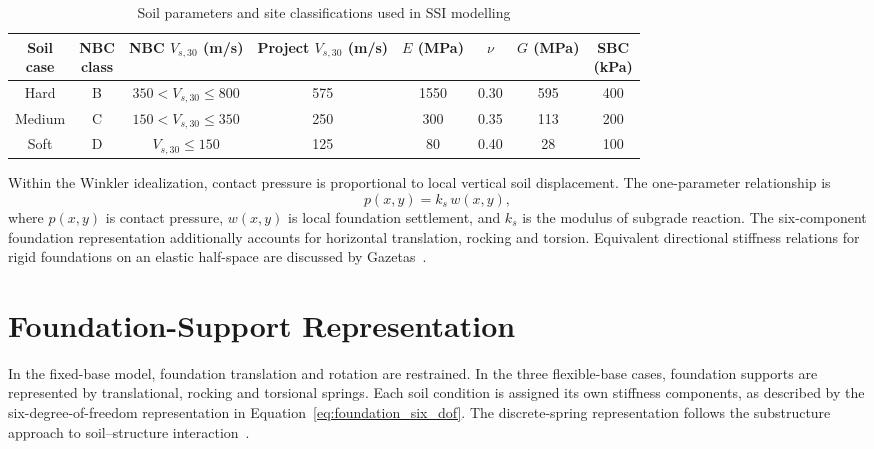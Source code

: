 \begin{table}[htbp]
\fontsize{11}{13}\selectfont\setlength{\tabcolsep}{4pt}
\centering
\caption{Soil parameters and site classifications used in SSI modelling}
\label{tab:soil_property_inputs}
\fontsize{11}{13}\selectfont
\setlength{\tabcolsep}{2pt}
\begin{tabular*}{\linewidth}{@{\extracolsep{\fill}}cccccccc@{}}
\toprule
\shortstack{Soil\\case} & \shortstack{NBC\\class} & \shortstack{NBC $V_{s,30}$\\(m/s)} & \shortstack{Project $V_{s,30}$\\(m/s)} & \shortstack{$E$\\(MPa)} & $\nu$ & \shortstack{$G$\\(MPa)} & \shortstack{SBC\\(kPa)} \\
\midrule
Hard & B & $350<V_{s,30}\leq800$ & 575 & 1550 & 0.30 & 595 & 400 \\
Medium & C & $150<V_{s,30}\leq350$ & 250 & 300 & 0.35 & 113 & 200 \\
Soft & D & $V_{s,30}\leq150$ & 125 & 80 & 0.40 & 28 & 100 \\
\bottomrule
\end{tabular*}
\end{table}
\FloatBarrier

Within the Winkler idealization, contact pressure is proportional to local vertical soil displacement. The one-parameter relationship is
\begin{equation}
p(x,y)=k_s\,w(x,y),
\label{eq:winkler_soil_reaction}
\end{equation}
where $p(x,y)$ is contact pressure, $w(x,y)$ is local foundation settlement, and $k_s$ is the modulus of subgrade reaction. The six-component foundation representation additionally accounts for horizontal translation, rocking and torsion. Equivalent directional stiffness relations for rigid foundations on an elastic half-space are discussed by Gazetas~\cite{gazetas1991}.

\section{Foundation-Support Representation}
In the fixed-base model, foundation translation and rotation are restrained. In the three flexible-base cases, foundation supports are represented by translational, rocking and torsional springs. Each soil condition is assigned its own stiffness components, as described by the six-degree-of-freedom representation in Equation~\ref{eq:foundation_six_dof}. The discrete-spring representation follows the substructure approach to soil--structure interaction~\cite{wolf1985,gazetas1991}.

